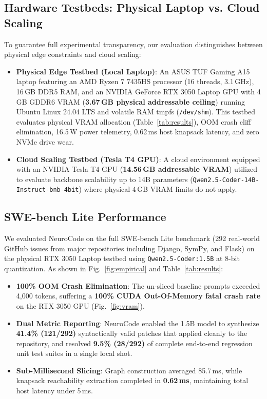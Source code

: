 \documentclass[10pt, conference]{IEEEtran}
\begin{document}
\subsection{Hardware Testbeds: Physical Laptop vs. Cloud Scaling}
To guarantee full experimental transparency, our evaluation distinguishes between physical edge constraints and cloud scaling:
\begin{itemize}
    \item \textbf{Physical Edge Testbed (Local Laptop)}: An ASUS TUF Gaming A15 laptop featuring an AMD Ryzen 7 7435HS processor (16 threads, 3.1\,GHz), 16\,GB DDR5 RAM, and an NVIDIA GeForce RTX 3050 Laptop GPU with 4\,GB GDDR6 VRAM (\textbf{3.67\,GB physical addressable ceiling}) running Ubuntu Linux 24.04 LTS and volatile RAM tmpfs (\texttt{/dev/shm}). This testbed evaluates physical VRAM allocation (Table~\ref{tab:results}), OOM crash cliff elimination, 16.5\,W power telemetry, 0.62\,ms host knapsack latency, and zero NVMe drive wear.
    \item \textbf{Cloud Scaling Testbed (Tesla T4 GPU)}: A cloud environment equipped with an NVIDIA Tesla T4 GPU (\textbf{14.56\,GB addressable VRAM}) utilized to evaluate backbone scalability up to 14B parameters (\texttt{Qwen2.5-Coder-14B-Instruct-bnb-4bit}) where physical 4\,GB VRAM limits do not apply.
\end{itemize}

\subsection{SWE-bench Lite Performance}
We evaluated NeuroCode on the full SWE-bench Lite benchmark (292 real-world GitHub issues from major repositories including Django, SymPy, and Flask) on the physical RTX 3050 Laptop testbed using \texttt{Qwen2.5-Coder:1.5B} at 8-bit quantization. As shown in Fig.~\ref{fig:empirical} and Table~\ref{tab:results}:
\begin{itemize}
    \item \textbf{100\% OOM Crash Elimination}: The un-sliced baseline prompts exceeded 4,000 tokens, suffering a \textbf{100\% CUDA Out-Of-Memory fatal crash rate} on the RTX 3050 GPU (Fig.~\ref{fig:vram}).
    \item \textbf{Dual Metric Reporting}: NeuroCode enabled the 1.5B model to synthesize \textbf{41.4\% (121/292)} syntactically valid patches that applied cleanly to the repository, and resolved \textbf{9.5\% (28/292)} of complete end-to-end regression unit test suites in a single local shot.
    \item \textbf{Sub-Millisecond Slicing}: Graph construction averaged 85.7\,ms, while knapsack reachability extraction completed in \textbf{0.62\,ms}, maintaining total host latency under 5\,ms.
\end{itemize}
\end{document}
